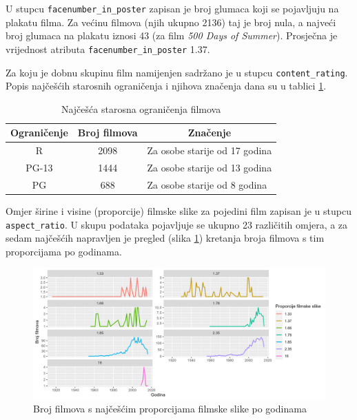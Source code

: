 	 U stupcu \texttt{facenumber\_in\_poster} zapisan je broj glumaca koji se pojavljuju na plakatu filma. Za većinu filmova (njih ukupno 2136) taj je broj nula, a najveći broj glumaca na plakatu iznosi 43 (za film \textit{500 Days of Summer}). Prosječna je vrijednost atributa \texttt{facenumber\_in\_poster} 1.37. 
	 
	 Za koju je dobnu skupinu film namijenjen sadržano je u stupcu \texttt{content\_rating}. Popis najčešćih starosnih ograničenja i njihova značenja dana su u tablici \ref{content_rating}.
	 
	 \begin{table}[h]
	 	\centering
	 	\renewcommand{\arraystretch}{1.5} %
	 	\begin{tabular}{|c|c|l|}
	 		\hline
	 		\multicolumn{1}{|c|}{\textbf{Ograničenje}} & \multicolumn{1}{c|}{\textbf{Broj filmova}} & \multicolumn{1}{c|}{\textbf{Značenje}} \\
	 		\hline
	 		R & 2098 & Za osobe starije od 17 godina \\
	 		\hline 
	 		PG-13 & 1444 & Za osobe starije od 13 godina \\
	 		\hline
	 		PG & 688 & Za osobe starije od 8 godina \\
	 		\hline
	 	\end{tabular}
	 	\caption{Najčešća starosna ograničenja filmova}
	 	\label{content_rating}
	 \end{table}
	 
	 Omjer širine i visine (proporcije) filmske slike za pojedini film zapisan je u stupcu \texttt{aspect\_ratio}. U skupu podataka pojavljuje se ukupno 23 različitih omjera, a za sedam najčešćih napravljen je pregled (slika \ref{proporcije}) kretanja broja filmova s tim proporcijama po godinama. 
	 
	  \begin{figure}[H]
	 	\centering
	 	\includegraphics[width=15cm]{../figures/analysis/proporcije_i_godine.png}
	 	\caption{Broj filmova s najčešćim proporcijama filmske slike po godinama }
	 	\label{proporcije}
	 \end{figure}
	 
